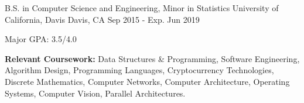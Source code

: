 

\begin{cventries}
  \cventry
    {B.S. in Computer Science and Engineering, Minor in Statistics} %
    {University of California, Davis} %
    {Davis, CA} %
    {Sep 2015 - Exp. Jun 2019} %
    {
      \begin{cvitems} %
        \item {Major GPA: 3.5/4.0}
      \end{cvitems}
    }

\end{cventries}

\begin{cvparagraph}
  \textbf{Relevant Coursework: }
  Data Structures \& Programming, Software Engineering, Algorithm Design,
  Programming Languages, Cryptocurrency Technologies, Discrete Mathematics,
  Computer Networks, Computer Architecture, Operating Systems, Computer Vision,
  Parallel Architectures.
\end{cvparagraph}

